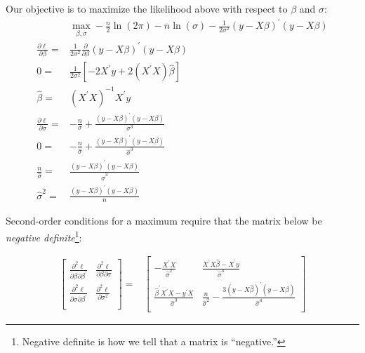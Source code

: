 \documentclass[12pt,english]{article}
\begin{document}
Our objective is to maximize the likelihood above with respect to $\beta$ and $\sigma$:
\begin{align*}
    & \max_{\beta,\sigma} -\frac{n}{2}\ln\left(2\pi\right) - n \ln \left(\sigma\right) - \frac{1}{2\sigma^{2}}\left(y-X\beta\right)^{\prime}\left(y-X\beta\right) \\
    \frac{\partial\ell}{\partial\beta} =& \frac{1}{2\sigma^{2}}\frac{\partial}{\partial\beta}\left(y-X\beta\right)^{\prime}\left(y-X\beta\right) \\
    0 =& \frac{1}{2\sigma^{2}}\left[-2X^{\prime}y +2\left(X^{\prime}X\right)\hat{\beta}\right] \\
    \hat{\beta} =& \left(X^{\prime}X\right)^{-1}X^{\prime}y \\
    \frac{\partial\ell}{\partial\sigma} =& -\frac{n}{\sigma} + \frac{\left(y-X\beta\right)^{\prime}\left(y-X\beta\right)}{\sigma^{3}} \\
    0 =& -\frac{n}{\hat{\sigma}} +  \frac{\left(y-X\beta\right)^{\prime}\left(y-X\beta\right)}{\hat{\sigma}^{3}} \\
    \frac{n}{\hat{\sigma}} =& \frac{\left(y-X\beta\right)^{\prime}\left(y-X\beta\right)}{\hat{\sigma}^{3}} \\
    \hat{\sigma}^{2} =& \frac{\left(y-X\beta\right)^{\prime}\left(y-X\beta\right)}{n} 
\end{align*}

Second-order conditions for a maximum require that the matrix below be \emph{negative definite}\footnote{Negative definite is how we tell that a matrix is ``negative.''}:

\begin{align}
    \label{eq:hess}
    \left[ {\begin{array}{cc}
                \frac{\partial^{2}\ell}{\partial\beta\partial\beta^{\prime}} & \frac{\partial^{2}\ell}{\partial\beta\partial\sigma}  \\
                \frac{\partial^{2}\ell}{\partial\sigma\partial\beta^{\prime}} & \frac{\partial^{2}\ell}{\partial\sigma^{2}}  \\
                  \end{array} } \right]
                  =&
    \left[ {\begin{array}{cc}
                - \frac{X^{\prime}X}{\hat{\sigma}^{2}} &  \frac{X^{\prime}X\hat{\beta} - X^{\prime}y}{\hat{\sigma}^{3}}  \\
                \frac{\hat{\beta}^{\prime}X^{\prime}X - y^{\prime}X}{\hat{\sigma}^{3}}  & \frac{n}{\hat{\sigma}^{2}} - \frac{3\left(y-X\hat{\beta}\right)^{\prime}\left(y-X\hat{\beta}\right)}{\hat{\sigma}^{4}}  \\
                  \end{array} } \right]
              \end{align}
\end{document}

